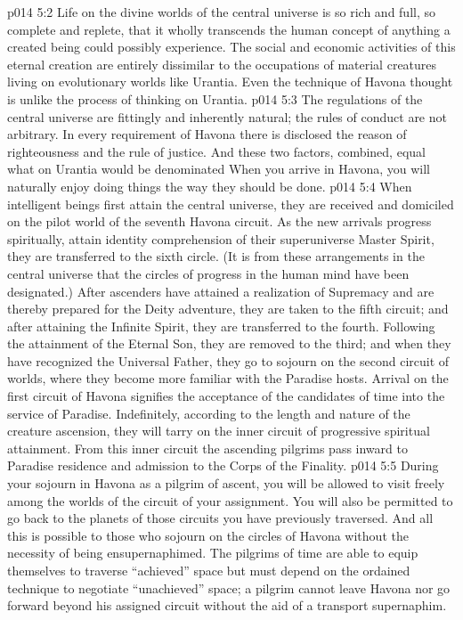 \vs p014 5:2 Life on the divine worlds of the central universe is so rich and full, so complete and replete, that it wholly transcends the human concept of anything a created being could possibly experience. The social and economic activities of this eternal creation are entirely dissimilar to the occupations of material creatures living on evolutionary worlds like Urantia. Even the technique of Havona thought is unlike the process of thinking on Urantia.
\vs p014 5:3 The regulations of the central universe are fittingly and inherently natural; the rules of conduct are not arbitrary. In every requirement of Havona there is disclosed the reason of righteousness and the rule of justice. And these two factors, combined, equal what on Urantia would be denominated  When you arrive in Havona, you will naturally enjoy doing things the way they should be done.
\vs p014 5:4 \pc When intelligent beings first attain the central universe, they are received and domiciled on the pilot world of the seventh Havona circuit. As the new arrivals progress spiritually, attain identity comprehension of their superuniverse Master Spirit, they are transferred to the sixth circle. (It is from these arrangements in the central universe that the circles of progress in the human mind have been designated.) After ascenders have attained a realization of Supremacy and are thereby prepared for the Deity adventure, they are taken to the fifth circuit; and after attaining the Infinite Spirit, they are transferred to the fourth. Following the attainment of the Eternal Son, they are removed to the third; and when they have recognized the Universal Father, they go to sojourn on the second circuit of worlds, where they become more familiar with the Paradise hosts. Arrival on the first circuit of Havona signifies the acceptance of the candidates of time into the service of Paradise. Indefinitely, according to the length and nature of the creature ascension, they will tarry on the inner circuit of progressive spiritual attainment. From this inner circuit the ascending pilgrims pass inward to Paradise residence and admission to the Corps of the Finality.
\vs p014 5:5 During your sojourn in Havona as a pilgrim of ascent, you will be allowed to visit freely among the worlds of the circuit of your assignment. You will also be permitted to go back to the planets of those circuits you have previously traversed. And all this is possible to those who sojourn on the circles of Havona without the necessity of being ensupernaphimed. The pilgrims of time are able to equip themselves to traverse “achieved” space but must depend on the ordained technique to negotiate “unachieved” space; a pilgrim cannot leave Havona nor go forward beyond his assigned circuit without the aid of a transport supernaphim.
